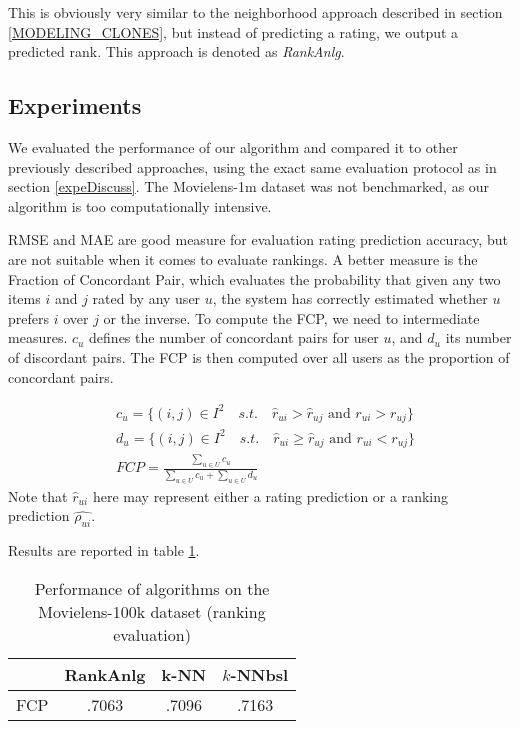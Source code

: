 \documentclass[conference]{IEEEtran}
\newcommand{\predr}[1]{\hat{r}_{#1}}
\begin{document}
This is obviously very similar to the neighborhood approach described in
section \ref{MODELING_CLONES}, but instead of predicting a rating, we output a
predicted rank. This approach is denoted as \textit{RankAnlg}.


\subsection{Experiments}

We evaluated the performance of our algorithm and compared it to other
previously described approaches, using the exact same evaluation protocol as in
section \ref{expeDiscuss}. The Movielens-1m dataset was not benchmarked, as our
algorithm is too computationally intensive.

RMSE and MAE are good measure for evaluation rating prediction accuracy, but
are not suitable when it comes to evaluate rankings. A better measure is the
Fraction of Concordant Pair, which evaluates the probability that given any two
items $i$ and $j$ rated by any user $u$, the system has correctly estimated
whether $u$ prefers $i$ over $j$ or the inverse. To compute the FCP, we need to
intermediate measures. $c_u$ defines the number of concordant pairs for user
$u$, and $d_u$ its number of discordant pairs. The FCP is then computed over all
users as the proportion of concordant pairs.

\begin{align*}
&c_u = \{(i, j) \in I^2 \quad s.t. \quad \predr{ui} > \predr{uj} \text{ and }
r_{ui} > r_{uj}\}\\
&d_u = \{(i, j) \in I^2 \quad s.t. \quad \predr{ui} \geq \predr{uj} \text{ and }
r_{ui} < r_{uj}\}\\
&FCP = \frac{\sum\limits_{u \in U} c_u}{\sum\limits_{u \in U} c_u + \sum\limits_{u \in U} d_u}
\end{align*}
Note that $\predr{ui}$ here may represent either a rating prediction or a
ranking prediction $\hat{\rho_{ui}}$.

Results are reported in table \ref{table:res100kRank}.

\begin{table}[!ht]
\centering
\caption{Performance of algorithms on the Movielens-100k dataset (ranking
evaluation)}
\label{table:res100kRank}
\begin{tabular}{| c || c | c | c |}
\toprule
     & RankAnlg &  k-NN & $k$-NNbsl\\
\midrule
FCP  &  .7063   & .7096 &  .7163   \\
\bottomrule
\end{tabular}
\end{table}
\end{document}
